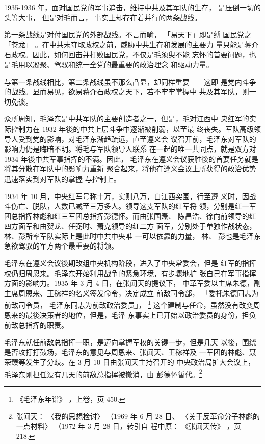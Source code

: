 1935-1936 年，面对国民党的军事追击，维持中共及其军队的生存，
是压倒一切的头等大事，
但是对毛而言，
事实上却存在着并行的两条战线。

第一条战线是对付国民党的外部战线。不言而喻，
「易天下」即是缚
国民党之「苍龙」 。在中共未夺取政权之前，威胁中共生存和发展的主要力
量只能是蒋介石政权。因此，如何回击并打败国民党，不仅是毛须臾不能
忘怀的首要问题，也是毛用以凝聚、驾驭和统一全党的最重要的政治理念
和驱动力量。

与第一条战线相比，第二条战线虽不那么凸显，却同样重要——这即
是党内斗争的战线。显而易见，欲易蒋介石政权之天下，若不牢牢掌握中
共及其军队，则一切免谈。

众所周知，毛泽东是中共军队的主要创造者之一，但是，毛对江西中
央红军的实际控制力在 1932 年後的中共上层斗争中逐渐被削弱，以至最
终丧失。军队高级领导人受到党的影响，对毛泽东渐趋疏远，直至遵义会
议召开前，毛泽东对军队的影响力仍是晦暗不明。将毛与军队领导人联系
在一起的唯一共同点，就是双方对 1934 年後中共军事指挥的不满。因此，
毛泽东在遵义会议获胜後的首要任务就是将其分散在军队中的影响力重新
聚合起来，将他在遵义会议上所获得的政治优势迅速落实到对军队的掌握
与控制上。

1934 年 10 月，中央红军号称十万，实则八万，自江西突围，行至遵
义时，因战斗伤亡、脱队，人数已减至三万多人。领导这支军队的红军将
领，分别是红一军团总指挥林彪和红三军团总指挥彭德怀。而由张国焘、
陈昌浩、徐向前领导的红四方面军和由贺龙、任弼时、萧克领导的红二方
面军，分别处于单独作战状态，林、彭所率军队实际上是此时中共中央唯
一可以依靠的力量， 林、
彭也是毛泽东急欲驾驭的军方两个最重要的将领。

毛泽东在遵义会议後期改组中央机构阶段，进入了中央常委会，但是
红军的指挥权仍归周恩来。毛泽东开始利用战争的紧急环境，有步骤地扩
张自己在军事指挥方面的影响力。1935 年 3 月 4 日，在张闻天的提议下，
中革军委以主席朱德，副主席周恩来、王稼祥的名义签发命令，决定成立
前敌司令部，
「委托朱德同志为前敌司令员，
毛泽东同志为前敌政治委员」，
\footnote{《毛泽东年谱》
，上卷，页 450.}
这个建制与任命，虽然没有改变周恩来的最後决策者的地位，但是，毛泽
东事实上已开始以政治委员的身份，担负前敌总指挥的职责。

毛泽东就任前敌总指挥一职，是迈向掌握军权的关键一步，但是几天
以後，围绕是否攻打打鼓场，毛泽东的意见与周恩来、张闻天、王稼祥及
一军团的林彪、聂荣臻等发生了分歧。在 3 月 10 日由张闻天主持召开的
中央政治局扩大会议上，毛泽东刚担任没有几天的前敌总指挥被撤消，由
彭德怀暂代。\footnote{张闻天：
〈我的思想检讨〉
（1969 年 6 月 28 日、
〈关于反革命分子林彪的一点材料〉
（1972 年 3 月 28 日，转引自
程中原：
《张闻天传》 ，页 218.} 

